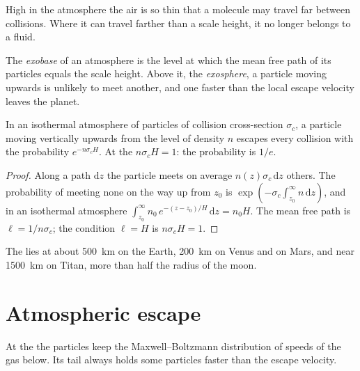 High in the atmosphere the air is so thin that a molecule may travel far
between collisions. Where it can travel farther than a scale height, it no
longer belongs to a fluid.

\begin{definition}\label{def:b3:planetary-atmospheres:exobase}
The \emph{exobase} of an atmosphere is the level at which
the mean free path of its particles equals the scale height. Above it,
the \emph{exosphere}, a particle moving upwards is
unlikely to meet another, and one faster than the local escape velocity
leaves the planet.
\end{definition}

\begin{proposition}\label{prop:b3:planetary-atmospheres:exobase}
In an isothermal atmosphere of particles of collision cross-section
$\sigma_c$, a particle moving vertically upwards from the level of density
$n$ escapes every collision with the probability $e^{-n\sigma_c H}$. At the
 $n\sigma_c H = 1$: the probability is $1/e$.
\end{proposition}

\begin{proof}
Along a path $\mathrm dz$ the particle meets on average $n(z)\sigma_c\,
\mathrm dz$ others. The probability of meeting none on the way up from
$z_0$ is $\exp(-\sigma_c\int_{z_0}^\infty n\,\mathrm dz)$, and in an
isothermal atmosphere $\int_{z_0}^\infty n_0\,e^{-(z-z_0)/H}\,\mathrm dz
= n_0 H$. The mean free path is $\ell = 1/n\sigma_c$; the condition $\ell
= H$ is $n\sigma_c H = 1$.
\end{proof}

The  lies at about \qty{500}{km} on the Earth, \qty{200}{km} on
Venus and on Mars, and near \qty{1500}{km} on Titan, more than half the
radius of the moon.

\section{Atmospheric escape}\label{sec:b3:planetary-atmospheres:escape}

At the  the particles keep the Maxwell--Boltzmann distribution of
speeds of the gas below. Its tail always holds some particles faster than
the escape velocity.

